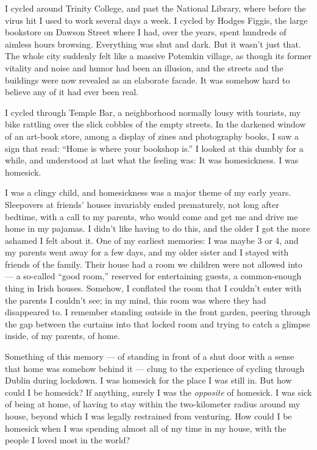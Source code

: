 I cycled around Trinity College, and past the National Library, where
before the virus hit I used to work several days a week. I cycled by
Hodges Figgis, the large bookstore on Dawson Street where I had, over
the years, spent hundreds of aimless hours browsing. Everything was shut
and dark. But it wasn't just that. The whole city suddenly felt like a
massive Potemkin village, as though its former vitality and noise and
humor had been an illusion, and the streets and the buildings were now
revealed as an elaborate facade. It was somehow hard to believe any of
it had ever been real.

I cycled through Temple Bar, a neighborhood normally lousy with
tourists, my bike rattling over the slick cobbles of the empty streets.
In the darkened window of an art-book store, among a display of zines
and photography books, I saw a sign that read: ``Home is where your
bookshop is.'' I looked at this dumbly for a while, and understood at
last what the feeling was: It was homesickness. I was homesick.

I was a clingy child, and homesickness was a major theme of my early
years. Sleepovers at friends' houses invariably ended prematurely, not
long after bedtime, with a call to my parents, who would come and get me
and drive me home in my pajamas. I didn't like having to do this, and
the older I got the more ashamed I felt about it. One of my earliest
memories: I was maybe 3 or 4, and my parents went away for a few days,
and my older sister and I stayed with friends of the family. Their house
had a room we children were not allowed into --- a so-called ``good
room,'' reserved for entertaining guests, a common-enough thing in Irish
houses. Somehow, I conflated the room that I couldn't enter with the
parents I couldn't see; in my mind, this room was where they had
disappeared to. I remember standing outside in the front garden, peering
through the gap between the curtains into that locked room and trying to
catch a glimpse inside, of my parents, of home.

Something of this memory --- of standing in front of a shut door with a
sense that home was somehow behind it --- clung to the experience of
cycling through Dublin during lockdown. I was homesick for the place I
was still in. But how could I be homesick? If anything, surely I was the
\emph{opposite} of homesick. I was sick of being at home, of having to
stay within the two-kilometer radius around my house, beyond which I was
legally restrained from venturing. How could I be homesick when I was
spending almost all of my time in my house, with the people I loved most
in the world?

